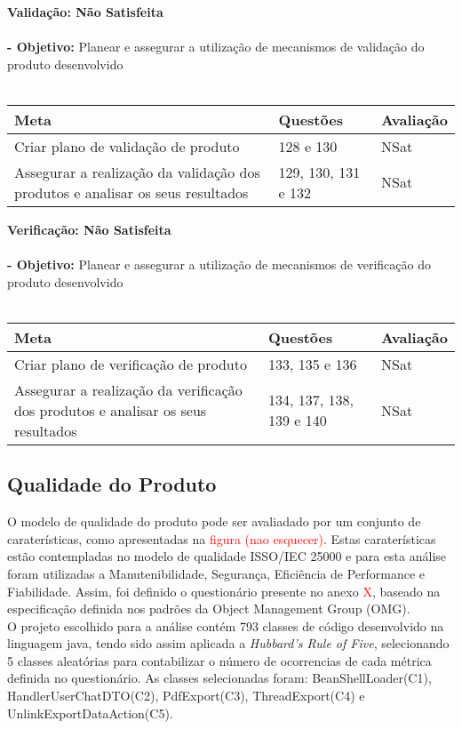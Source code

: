 \documentclass[openany,10pt,a4paper]{article}
\begin{document}
\textbf{Validação: Não Satisfeita} \\  \\
\textbf{- Objetivo:} Planear e assegurar a utilização de mecanismos de validação do produto desenvolvido \\
\\
\begin{tabular}{p{3in}|p{1.5in}|p{1.5in}}		
\textbf{Meta} & \textbf{Questões} & \textbf{Avaliação} \\ \hline
Criar plano de validação de produto & 128 e 130 & NSat \\
Assegurar a realização da validação dos produtos e analisar os seus resultados & 129, 130, 131 e 132 & NSat \\
\end{tabular}

\textbf{Verificação: Não Satisfeita} \\  \\
\textbf{- Objetivo:} Planear e assegurar a utilização de mecanismos de verificação do produto desenvolvido \\
\\
\begin{tabular}{p{3in}|p{1.5in}|p{1.5in}}		
\textbf{Meta} & \textbf{Questões} & \textbf{Avaliação} \\ \hline
Criar plano de verificação de produto & 133, 135 e 136 & NSat \\
Assegurar a realização da verificação dos produtos e analisar os seus resultados & 134, 137, 138, 139 e 140 & NSat \\
\end{tabular}

\subsection{Qualidade do Produto}
O modelo de qualidade do produto pode ser avaliadado por um conjunto de caraterísticas, como apresentadas na \textcolor{red}{figura (nao esquecer)}. Estas caraterísticas estão contempladas no modelo de qualidade ISSO/IEC 25000 e para esta análise foram utilizadas a Manutenibilidade, Segurança, Eficiência de Performance e Fiabilidade. Assim, foi definido o questionário presente no anexo \textcolor{red}{X}, baseado na especificação definida nos padrões da Object Management Group (OMG). \\
O projeto escolhido para a análise contém 793 classes de código desenvolvido na linguagem java, tendo sido assim aplicada a 
\textit{Hubbard’s Rule of Five}, selecionando 5 classes aleatórias para contabilizar o número de ocorrencias de cada métrica definida no questionário. As classes selecionadas foram: BeanShellLoader(C1), HandlerUserChatDTO(C2), PdfExport(C3), ThreadExport(C4) e UnlinkExportDataAction(C5).\\
\end{document}
